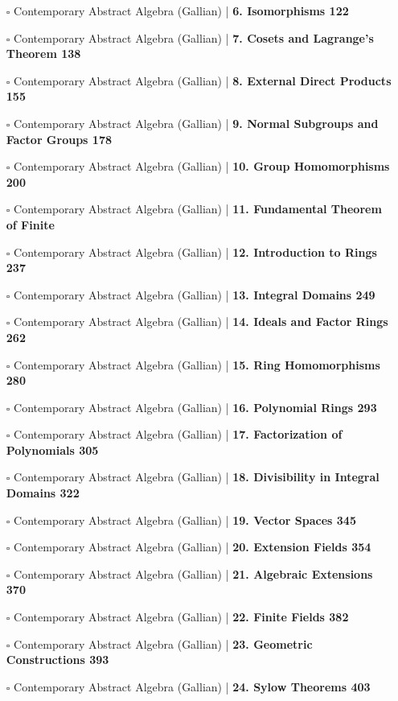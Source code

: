 \documentclass[a4, landscape, 12pt]{article}
\newcommand{\checkbox}{$\square$}%
\begin{document}
\begin{itemize}
{}
\item [\checkbox] Contemporary Abstract Algebra (Gallian)  | \textbf{6. Isomorphisms 122
}
\item [\checkbox] Contemporary Abstract Algebra (Gallian)  | \textbf{7. Cosets and Lagrange’s Theorem 138
}
\item [\checkbox] Contemporary Abstract Algebra (Gallian)  | \textbf{8. External Direct Products 155
}
\item [\checkbox] Contemporary Abstract Algebra (Gallian)  | \textbf{9. Normal Subgroups and Factor Groups 178
}
\item [\checkbox] Contemporary Abstract Algebra (Gallian)  | \textbf{10. Group Homomorphisms 200
}
\item [\checkbox] Contemporary Abstract Algebra (Gallian)  | \textbf{11. Fundamental Theorem of Finite
}
\item [\checkbox] Contemporary Abstract Algebra (Gallian)  | \textbf{12. Introduction to Rings 237
}
\item [\checkbox] Contemporary Abstract Algebra (Gallian)  | \textbf{13. Integral Domains 249
}
\item [\checkbox] Contemporary Abstract Algebra (Gallian)  | \textbf{14. Ideals and Factor Rings 262
}
\item [\checkbox] Contemporary Abstract Algebra (Gallian)  | \textbf{15. Ring Homomorphisms 280
}
\item [\checkbox] Contemporary Abstract Algebra (Gallian)  | \textbf{16. Polynomial Rings 293
}
\item [\checkbox] Contemporary Abstract Algebra (Gallian)  | \textbf{17. Factorization of Polynomials 305
}
\item [\checkbox] Contemporary Abstract Algebra (Gallian)  | \textbf{18. Divisibility in Integral Domains 322
}
\item [\checkbox] Contemporary Abstract Algebra (Gallian)  | \textbf{19. Vector Spaces 345
}
\item [\checkbox] Contemporary Abstract Algebra (Gallian)  | \textbf{20. Extension Fields 354
}
\item [\checkbox] Contemporary Abstract Algebra (Gallian)  | \textbf{21. Algebraic Extensions 370
}
\item [\checkbox] Contemporary Abstract Algebra (Gallian)  | \textbf{22. Finite Fields 382
}
\item [\checkbox] Contemporary Abstract Algebra (Gallian)  | \textbf{23. Geometric Constructions 393
}
\item [\checkbox] Contemporary Abstract Algebra (Gallian)  | \textbf{24. Sylow Theorems 403
}
\end{itemize}
\end{document}
